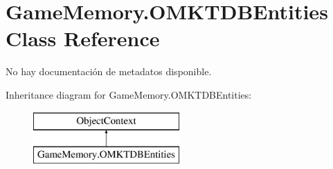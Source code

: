 \hypertarget{class_game_memory_1_1_o_m_k_t_d_b_entities}{\section{Game\-Memory.\-O\-M\-K\-T\-D\-B\-Entities Class Reference}
\label{class_game_memory_1_1_o_m_k_t_d_b_entities}
}


No hay documentación de metadatos disponible.  


Inheritance diagram for Game\-Memory.\-O\-M\-K\-T\-D\-B\-Entities\-:\begin{figure}[H]
\begin{center}
\leavevmode
\includegraphics[height=2.000000cm]{class_game_memory_1_1_o_m_k_t_d_b_entities}
\end{center}
\end{figure}
